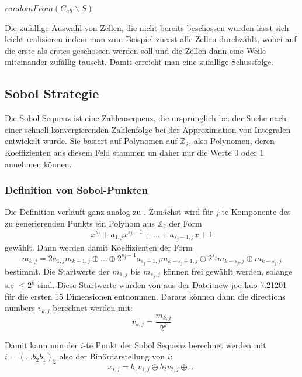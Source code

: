\documentclass[a4paper,12pt]{llncs}
\numberwithin{equation}{section}
\begin{document}
\begin{tcolorbox}
	\begin{algorithmic}
		\State \Return $randomFrom(C_{all}\backslash S)$
		\EndFunction
	\end{algorithmic}
\end{tcolorbox}

Die zufällige Auswahl von Zellen, die nicht bereits beschossen wurden lässt sich leicht realisieren indem man zum Beispiel zuerst alle Zellen durchzählt, wobei auf die erste als erstes geschossen werden soll und die Zellen dann eine Weile miteinander zufällig tauscht. Damit erreicht man eine zufällige Schussfolge.


\subsection{Sobol Strategie}
Die Sobol-Sequenz ist eine Zahlensequenz, die ursprünglich bei der Suche nach einer schnell konvergierenden Zahlenfolge bei der Approximation von Integralen entwickelt wurde.
Sie basiert auf Polynomen auf $\mathbb{Z}_2$, also Polynomen, deren Koeffizienten aus diesem Feld stammen un daher nur die Werte 0 oder 1 annehmen können.

\subsubsection{Definition von Sobol-Punkten}
Die Definition verläuft ganz analog zu \cite{JK03}. Zunächst wird für $j$-te Komponente des zu generierenden Punkts ein Polynom aus $\mathbb{Z}_2$ der Form
\begin{equation}
x^{s_j}+a_{1,j}x^{s_j-1}+\dots +a_{s_j-1,j}x+1
\end{equation}
gewählt. Dann werden damit Koeffizienten der Form
\begin{equation}
m_{k,j}=2a_{1,j}m_{k-1,j}\oplus\dots\oplus 2^{s_j-1}a_{s_j-1,j}m_{k-s_j+1,j}\oplus2^{s_j}m_{k-s_j,j}\oplus m_{k-s_j,j}
\end{equation}
bestimmt. Die Startwerte der $m_{1,j}$ bis $m_{s_j,j}$ können frei gewählt werden, solange sie $\leq 2^k$ sind. Diese Startwerte wurden von \cite{JK10} aus der Datei new-joe-kuo-7.21201 für die ersten 15 Dimensionen entnommen. Daraus können dann die directions numbers $v_{k,j}$ berechnet werden mit:
\begin{equation}
v_{k,j} = \frac{m_{k,j}}{2^k}
\end{equation}

Damit kann nun der $i$-te Punkt der Sobol Sequenz berechnet werden mit $i=(\dots b_2 b_1)_2$ also der Binärdarstellung von $i$:
\begin{equation}
x_{i,j}=b_1v_{1,j}\oplus b_2v_{2,j}\oplus\dots
\end{equation}
\end{document}
